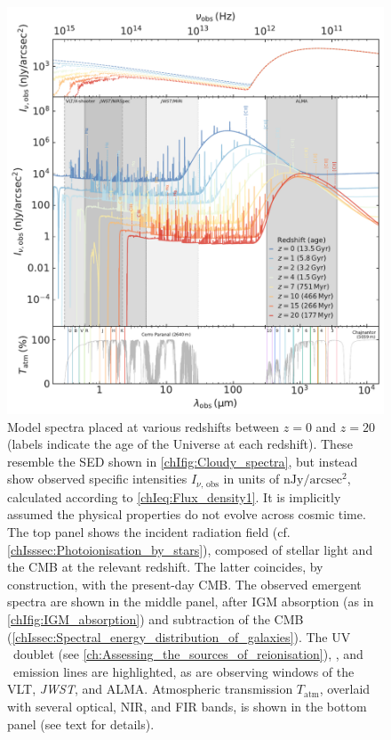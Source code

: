 \begin{figure}
    \centering
    \includegraphics[width=\linewidth]{"Figs/Cloudy_spectra_redshift"}
    \caption[Model spectra placed at various redshifts between $z = 0$ and $z = 20$]
    {Model spectra placed at various redshifts between $z = 0$ and $z = 20$ (labels indicate the age of the Universe at each redshift). These resemble the SED shown in \cref{chIfig:Cloudy_spectra}, but instead show observed specific intensities $I_{\nu, \, \text{obs}}$ in units of $\mathrm{nJy/arcsec^2}$, calculated according to \cref{chIeq:Flux_density1}. It is implicitly assumed the physical properties do not evolve across cosmic time. The top panel shows the incident radiation field (cf. \cref{chIsssec:Photoionisation_by_stars}), composed of stellar light and the CMB at the relevant redshift. The latter coincides, by construction, with the present-day CMB. The observed emergent spectra are shown in the middle panel, after IGM absorption (as in \cref{chIfig:IGM_absorption}) and subtraction of the CMB (\cref{chIssec:Spectral_energy_distribution_of_galaxies}). The UV \CIII\ doublet (see \cref{ch:Assessing_the_sources_of_reionisation}), \Halpha, and \CIILam\ emission lines are highlighted, as are observing windows of the VLT, \textit{JWST}, and ALMA. Atmospheric transmission $T_\text{atm}$, overlaid with several optical, NIR, and FIR bands, is shown in the bottom panel (see text for details).}
    \label{chIfig:Cloudy_spectra_redshift}
\end{figure}

